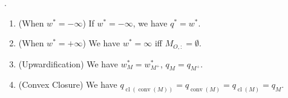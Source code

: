 \begin{lemm}.
	\label{lemm:031-direct-consequences}
	\begin{enumerate}[label=(\alph*)]
		\item (When $w^\ast=-\infty$) If $w^\ast=-\infty$, we have $q^\ast=w^\ast$.
		\item (When $w^\ast=+\infty$) We have $w^\ast=\infty$ iff $M_{O,:}=\emptyset$.
		\item (Upwardification) We have $w_M^\ast=w_{M^+}^\ast$, $q_M=q_{M^+}$.
		\item (Convex Closure) We have $q_{\operatorname{cl}(\operatorname{conv}(M))}=q_{\operatorname{conv}(M)}=q_{\operatorname{cl}(M)}=q_M$.
	\end{enumerate}
\end{lemm}


